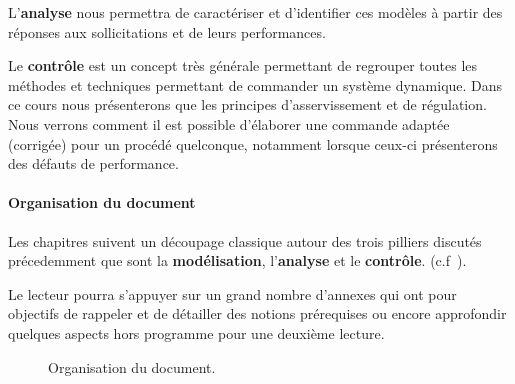 L'\textbf{analyse} nous permettra de caractériser et d'identifier 
ces modèles à partir des réponses aux sollicitations et de leurs performances.

Le \textbf{contrôle} est un concept très générale permettant de regrouper
toutes les méthodes et techniques permettant de commander un système dynamique.
Dans ce cours nous présenterons que les principes d'asservissement et de 
régulation. Nous verrons comment il est possible d'élaborer une commande 
adaptée (corrigée) pour un procédé quelconque, notamment lorsque ceux-ci 
présenterons des défauts de performance.

\paragraph{Organisation du document}
Les chapitres suivent un découpage classique autour des trois pilliers 
discutés précedemment que sont la \textbf{modélisation}, l'\textbf{analyse} 
et le \textbf{contrôle}. (c.f~).

Le lecteur pourra s'appuyer sur un grand nombre d'annexes qui ont pour 
objectifs de rappeler et de détailler des notions prérequises ou encore 
approfondir quelques aspects hors programme pour une deuxième lecture.
\begin{figure}[!h]
    \renewcommand\thefigure{A}
    \centering
        {
            \tikzset{external/export=false}
            
        }
    \caption{Organisation du document.\label{fig-diagramme_cours}}
\end{figure}
